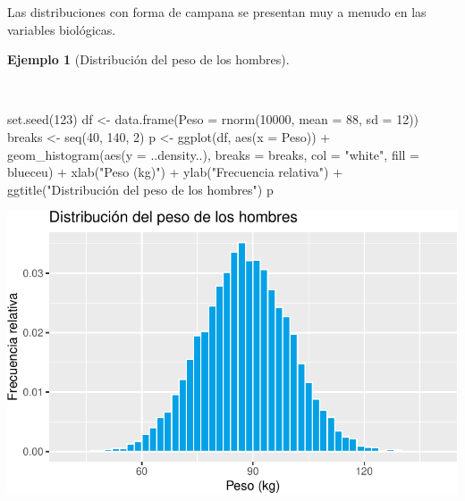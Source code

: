 \documentclass[
  a4paper,
]{scrreport}
\newenvironment{Shaded}{\begin{snugshade}}{\end{snugshade}}
\newcommand{\AttributeTok}[1]{\textcolor[rgb]{0.40,0.45,0.13}{#1}}
\newcommand{\DecValTok}[1]{\textcolor[rgb]{0.68,0.00,0.00}{#1}}
\newcommand{\FunctionTok}[1]{\textcolor[rgb]{0.28,0.35,0.67}{#1}}
\newcommand{\NormalTok}[1]{\textcolor[rgb]{0.00,0.23,0.31}{#1}}
\newcommand{\OtherTok}[1]{\textcolor[rgb]{0.00,0.23,0.31}{#1}}
\newcommand{\SpecialCharTok}[1]{\textcolor[rgb]{0.37,0.37,0.37}{#1}}
\newcommand{\StringTok}[1]{\textcolor[rgb]{0.13,0.47,0.30}{#1}}
\theoremstyle{plain}
\theoremstyle{definition}
\newtheorem{example}{Ejemplo}[chapter]
\theoremstyle{definition}
\theoremstyle{remark}
\begin{document}
Las distribuciones con forma de campana se presentan muy a menudo en las
variables biológicas.

\begin{example}[Distribución del peso de los
hombres]\protect\hypertarget{exm-distribucion-peso-hombres}{}\label{exm-distribucion-peso-hombres}

~

\begin{Shaded}
\begin{Highlighting}[]
\FunctionTok{set.seed}\NormalTok{(}\DecValTok{123}\NormalTok{)}
\NormalTok{df }\OtherTok{\textless{}{-}} \FunctionTok{data.frame}\NormalTok{(}\AttributeTok{Peso =} \FunctionTok{rnorm}\NormalTok{(}\DecValTok{10000}\NormalTok{, }\AttributeTok{mean =} \DecValTok{88}\NormalTok{, }\AttributeTok{sd =} \DecValTok{12}\NormalTok{))}
\NormalTok{breaks }\OtherTok{\textless{}{-}} \FunctionTok{seq}\NormalTok{(}\DecValTok{40}\NormalTok{, }\DecValTok{140}\NormalTok{, }\DecValTok{2}\NormalTok{)}
\NormalTok{p }\OtherTok{\textless{}{-}} \FunctionTok{ggplot}\NormalTok{(df, }\FunctionTok{aes}\NormalTok{(}\AttributeTok{x =}\NormalTok{ Peso)) }\SpecialCharTok{+}
    \FunctionTok{geom\_histogram}\NormalTok{(}\FunctionTok{aes}\NormalTok{(}\AttributeTok{y =}\NormalTok{ ..density..), }\AttributeTok{breaks =}\NormalTok{ breaks, }\AttributeTok{col =} \StringTok{"white"}\NormalTok{, }\AttributeTok{fill =}\NormalTok{ blueceu) }\SpecialCharTok{+}
    \FunctionTok{xlab}\NormalTok{(}\StringTok{"Peso (kg)"}\NormalTok{) }\SpecialCharTok{+}
    \FunctionTok{ylab}\NormalTok{(}\StringTok{"Frecuencia relativa"}\NormalTok{) }\SpecialCharTok{+}
    \FunctionTok{ggtitle}\NormalTok{(}\StringTok{"Distribución del peso de los hombres"}\NormalTok{)}
\NormalTok{p}
\end{Highlighting}
\end{Shaded}

\includegraphics{02-estadistica-descriptiva_files/figure-pdf/histograma-peso-hombres-1.pdf}

\end{example}
\end{document}
